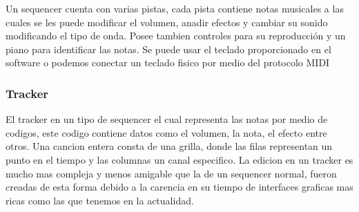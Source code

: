 Un sequencer cuenta con varias pistas, cada pista contiene notas musicales
a las cuales se les puede modificar el volumen, anadir efectos y cambiar
su sonido modificando el tipo de onda. Posee tambien controles para su
reproducción y un piano para identificar las notas. Se puede usar
el teclado proporcionado en el software o podemos conectar un teclado
fisico por medio del protocolo MIDI

\subsubsection{Tracker}

El tracker en un tipo de sequencer el cual representa las notas por medio
de codigos, este codigo contiene datos como el volumen, la nota, el efecto
entre otros. Una cancion entera consta de una grilla, donde las filas
representan un punto en el tiempo y las columnas un canal especifico.
La edicion en un tracker es mucho mas compleja y menos amigable que
la de un sequencer normal, fueron creadas de esta forma debido a la
carencia en su tiempo de interfaces graficas mas ricas como las que
tenemos en la actualidad.
